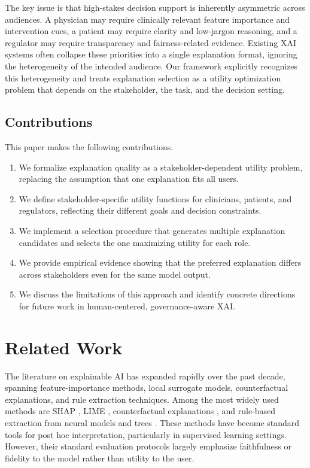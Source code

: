 \documentclass{article}
\begin{document}
The key issue is that high-stakes decision support is inherently asymmetric across audiences. A physician may require clinically relevant feature importance and intervention cues, a patient may require clarity and low-jargon reasoning, and a regulator may require transparency and fairness-related evidence. Existing XAI systems often collapse these priorities into a single explanation format, ignoring the heterogeneity of the intended audience. Our framework explicitly recognizes this heterogeneity and treats explanation selection as a utility optimization problem that depends on the stakeholder, the task, and the decision setting.

\subsection{Contributions}

This paper makes the following contributions.

\begin{enumerate}[leftmargin=1.8em]
    \item We formalize explanation quality as a stakeholder-dependent utility problem, replacing the assumption that one explanation fits all users.
    \item We define stakeholder-specific utility functions for clinicians, patients, and regulators, reflecting their different goals and decision constraints.
    \item We implement a selection procedure that generates multiple explanation candidates and selects the one maximizing utility for each role.
    \item We provide empirical evidence showing that the preferred explanation differs across stakeholders even for the same model output.
    \item We discuss the limitations of this approach and identify concrete directions for future work in human-centered, governance-aware XAI.
\end{enumerate}

\section{Related Work}

The literature on explainable AI has expanded rapidly over the past decade, spanning feature-importance methods, local surrogate models, counterfactual explanations, and rule extraction techniques. Among the most widely used methods are SHAP \citep{lundberg2017}, LIME \citep{ribeiro2016}, counterfactual explanations \citep{wachter2017}, and rule-based extraction from neural models and trees \citep{craven1996}. These methods have become standard tools for post hoc interpretation, particularly in supervised learning settings. However, their standard evaluation protocols largely emphasize faithfulness or fidelity to the model rather than utility to the user.
\end{document}
